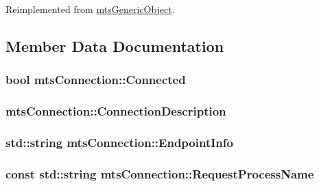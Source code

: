 Reimplemented from \hyperlink{classmts_generic_object_a2030aaa58bc215eccce1dc8d20dd0fdc}{mts\+Generic\+Object}.



\subsection{Member Data Documentation}
\hypertarget{classmts_connection_a2384cf6081cf01b9330bf6810108c2b5}{}
\subsubsection[{Connected}]{\setlength{\rightskip}{0pt plus 5cm}bool mts\+Connection\+::\+Connected\hspace{0.3cm}{\ttfamily [protected]}}\label{classmts_connection_a2384cf6081cf01b9330bf6810108c2b5}
\hypertarget{classmts_connection_a0a529fcb9c6627e79c49eb05265dd43e}{}
\subsubsection[{Connection\+Description}]{ mts\+Connection\+::\+Connection\+Description\hspace{0.3cm}{\ttfamily [protected]}}\label{classmts_connection_a0a529fcb9c6627e79c49eb05265dd43e}
\hypertarget{classmts_connection_ad5e701a7d4fe0a27b084d0f8d161c7d6}{}
\subsubsection[{Endpoint\+Info}]{\setlength{\rightskip}{0pt plus 5cm}std\+::string mts\+Connection\+::\+Endpoint\+Info\hspace{0.3cm}{\ttfamily [protected]}}\label{classmts_connection_ad5e701a7d4fe0a27b084d0f8d161c7d6}
\hypertarget{classmts_connection_a81c4b5147db8f46d70b30c7fabbc72c8}{}
\subsubsection[{Request\+Process\+Name}]{\setlength{\rightskip}{0pt plus 5cm}const std\+::string mts\+Connection\+::\+Request\+Process\+Name\hspace{0.3cm}{\ttfamily [protected]}}\label{classmts_connection_a81c4b5147db8f46d70b30c7fabbc72c8}
\hypertarget{classmts_connection_a6c190911c627762bcdc0a2145a6739c8}{}
